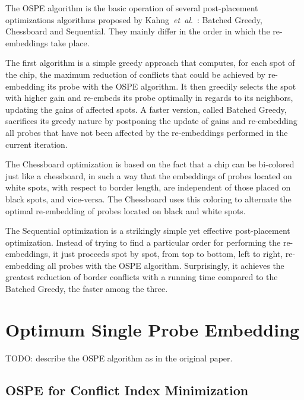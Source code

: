 \documentclass{llncs}
\begin{document}
The OSPE algorithm is the basic operation of several post-placement optimizations
algorithms proposed by Kahng~{\it et~al}.~\cite{KAHNG02,KAHNG03B}: Batched Greedy,
Chessboard and Sequential. They mainly differ in
the order in which the re-embeddings take place.

The first algorithm is a simple greedy approach that computes, for each spot of the chip,
the maximum reduction of conflicts that could be achieved by re-embedding its probe with
the OSPE algorithm. It then greedily selects the spot with higher gain and re-embeds
its probe optimally in regards to its neighbors, updating the gains of affected
spots. A faster version, called Batched Greedy, sacrifices its greedy nature by postponing
the update of gains and re-embedding all probes that have not been affected by the
re-embeddings performed in the current iteration.

The Chessboard optimization is based on the fact that a chip can be bi-colored
just like a chessboard, in such a way that the embeddings of probes located on
white spots, with respect to border length, are independent of those placed on black spots,
and vice-versa. The Chessboard uses this coloring to alternate the optimal re-embedding
of probes located on black and white spots.

The Sequential optimization is a strikingly simple yet effective post-placement
optimization. Instead of trying to find a particular order for performing the
re-embeddings, it just proceeds spot by spot, from top to bottom, left to right,
re-embedding all probes with the OSPE algorithm. Surprisingly, it achieves the greatest
reduction of border conflicts with a running time compared to the Batched Greedy,
the faster among the three.

\section{Optimum Single Probe Embedding}
\label{sec:ospe}

TODO: describe the OSPE algorithm as in the original paper.

\subsection{OSPE for Conflict Index Minimization}
\label{sec:ospe_ci}
\end{document}
